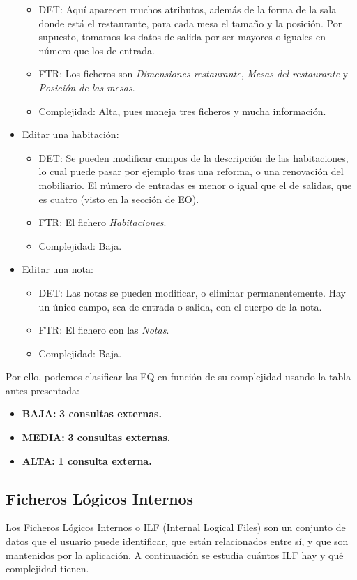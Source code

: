 \documentclass[spanish,a4paper,11pt, twoside]{report}	%
\begin{document}
\begin{itemize}
\begin{itemize}
 			\item{DET:} Aquí aparecen muchos atributos, además de la forma de la sala donde está el restaurante, para cada mesa el tamaño y la posición. Por supuesto, tomamos los datos de salida por ser mayores o iguales en número que los de entrada.
			\item{FTR:}  Los ficheros son \textit{Dimensiones restaurante}, \textit{Mesas del restaurante} y \textit{Posición de las mesas}.
			\item{Complejidad:} Alta, pues maneja tres ficheros y mucha información.
		\end{itemize}
		\item{Editar una habitación:} 
		\begin{itemize}
 			\item{DET:} Se pueden modificar campos de la descripción de las habitaciones, lo cual puede pasar por ejemplo tras una reforma, o una renovación del mobiliario. El número de entradas es menor o igual que el de salidas, que es cuatro (visto en la sección de EO).
			\item{FTR:} El fichero \textit{Habitaciones}.
			\item{Complejidad:} Baja.
		\end{itemize}
		\item{Editar una nota:} 
		\begin{itemize}
 			\item{DET:} Las notas se pueden modificar, o eliminar permanentemente. Hay un único campo, sea de entrada o salida, con el cuerpo de la nota.
			\item{FTR:} El fichero con las \textit{Notas}.
			\item{Complejidad:} Baja.
		\end{itemize}
	\end{itemize}

	Por ello, podemos clasificar las EQ en función de su complejidad usando la tabla antes presentada:
	\begin{itemize}
	\item{\textbf{BAJA:}} \textbf{3 consultas externas.}
	\item{\textbf{MEDIA:}} \textbf{3 consultas externas.}
	\item{\textbf{ALTA:}} \textbf{1 consulta externa.}
	\end{itemize}


	\subsection{Ficheros Lógicos Internos}
	Los Ficheros Lógicos Internos o ILF (Internal Logical Files) son un conjunto de datos que el usuario puede identificar, que están relacionados entre sí, y que son mantenidos por la aplicación. A continuación se estudia cuántos ILF hay y qué complejidad tienen. 
\end{document}
